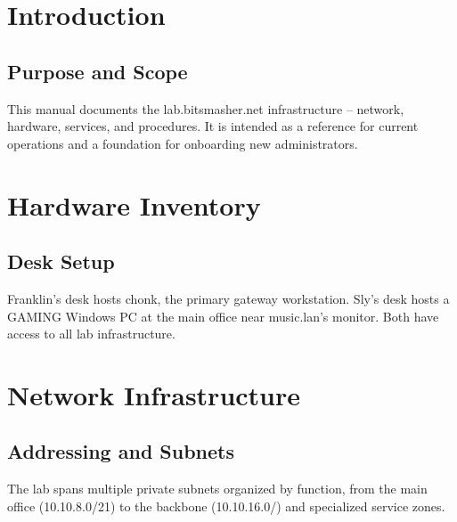 



\maketitle

\tableofcontents

\chapter{Introduction}

\section{Purpose and Scope}
This manual documents the lab.bitsmasher.net infrastructure -- network, hardware, services, and procedures. It is intended as a reference for current operations and a foundation for onboarding new administrators.

% 

\chapter{Hardware Inventory}

\section{Desk Setup}
Franklin's desk hosts chonk, the primary gateway workstation. Sly's desk hosts a GAMING Windows PC at the main office near music.lan's monitor. Both have access to all lab infrastructure.

% 


\chapter{Network Infrastructure}

\section{Addressing and Subnets}
The lab spans multiple private subnets organized by function, from the main office (10.10.8.0/21) to the backbone (10.10.16.0/) and specialized service zones.

